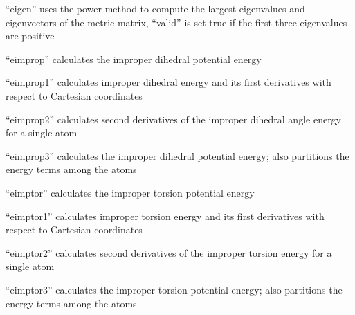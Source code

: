 \documentclass[letterpaper,11pt,english]{sphinxmanual}
\begin{document}
\sphinxAtStartPar
“eigen” uses the power method to compute the largest eigenvalues and eigenvectors of the metric matrix, “valid” is set true if the first three eigenvalues are positive

\sphinxAtStartPar
{}

\sphinxAtStartPar
{}

\sphinxAtStartPar
{}

\sphinxAtStartPar
{}

\sphinxAtStartPar
{}

\sphinxAtStartPar
{}

\sphinxAtStartPar
“eimprop” calculates the improper dihedral potential energy

\sphinxAtStartPar
{}

\sphinxAtStartPar
“eimprop1” calculates improper dihedral energy and its first derivatives with respect to Cartesian coordinates

\sphinxAtStartPar
{}

\sphinxAtStartPar
“eimprop2” calculates second derivatives of the improper dihedral angle energy for a single atom

\sphinxAtStartPar
{}

\sphinxAtStartPar
“eimprop3” calculates the improper dihedral potential energy; also partitions the energy terms among the atoms

\sphinxAtStartPar
{}

\sphinxAtStartPar
“eimptor” calculates the improper torsion potential energy

\sphinxAtStartPar
{}

\sphinxAtStartPar
“eimptor1” calculates improper torsion energy and its first derivatives with respect to Cartesian coordinates

\sphinxAtStartPar
{}

\sphinxAtStartPar
“eimptor2” calculates second derivatives of the improper torsion energy for a single atom

\sphinxAtStartPar
{}

\sphinxAtStartPar
“eimptor3” calculates the improper torsion potential energy; also partitions the energy terms among the atoms
\end{document}
